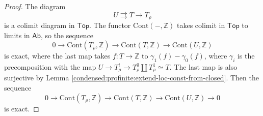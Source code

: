 \begin{proof}
%
The diagram
\begin{equation*}
U \rightrightarrows T  \to T _{\rho}
\end{equation*}
is a colimit diagram in $ \mathsf{Top} $.
The functor $ \mathrm{Cont}(-, \mathbb{Z}) $ takes colimit in $ \mathsf{Top} $
to limits in $ \mathsf{Ab} $, so the sequence
\begin{equation*}
0\to \mathrm{Cont}(T _{\rho}, \mathbb{Z}) \to \mathrm{Cont}(T, \mathbb{Z})\to \mathrm{Cont}(U, \mathbb{Z})
\end{equation*}
is exact, where the last map takes $ f:T\to \mathbb{Z} $ to $ \gamma _{1}(f) - \gamma _{0}(f) $, where $ \gamma _{i} $
is the precomposition with the map $ U \to T ^{i}_{\rho}\to T ^{0}_{\rho}\coprod T ^{1}_{\rho} \simeq T $.
The last map is also surjective by Lemma \ref{condensed:profinite:extend-loc-const-from-closed}.
Then the sequence
\begin{equation*}
0\to \mathrm{Cont}(T _{\rho}, \mathbb{Z}) \to \mathrm{Cont}(T, \mathbb{Z})\to \mathrm{Cont}(U, \mathbb{Z})\to 0
\end{equation*}
is exact.


\end{proof}
